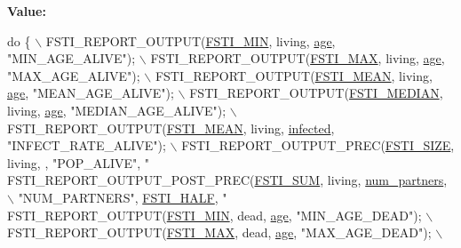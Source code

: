 {\bfseries Value\+:}
\begin{DoxyCode}
\textcolor{keywordflow}{do} \{                                           \(\backslash\)
        FSTI\_REPORT\_OUTPUT(\mbox{\hyperlink{fsti-report_8h_a23a8b3ad8faaf4c4f0f645486e27faeb}{FSTI\_MIN}}, living, \mbox{\hyperlink{structfsti__agent_a44c237039bb02720a770b625f905cf76}{age}}, \textcolor{stringliteral}{"MIN\_AGE\_ALIVE"});     \(\backslash\)
        FSTI\_REPORT\_OUTPUT(\mbox{\hyperlink{fsti-report_8h_ab932f3ee72d85924f642c9adfce84dc3}{FSTI\_MAX}}, living, \mbox{\hyperlink{structfsti__agent_a44c237039bb02720a770b625f905cf76}{age}}, \textcolor{stringliteral}{"MAX\_AGE\_ALIVE"});     \(\backslash\)
        FSTI\_REPORT\_OUTPUT(\mbox{\hyperlink{fsti-report_8h_a56c545164f457022ec874321798f99af}{FSTI\_MEAN}}, living, \mbox{\hyperlink{structfsti__agent_a44c237039bb02720a770b625f905cf76}{age}}, \textcolor{stringliteral}{"MEAN\_AGE\_ALIVE"});   \(\backslash\)
        FSTI\_REPORT\_OUTPUT(\mbox{\hyperlink{fsti-report_8h_abecbb06bd9bca39305faadb443899fa9}{FSTI\_MEDIAN}}, living, \mbox{\hyperlink{structfsti__agent_a44c237039bb02720a770b625f905cf76}{age}}, \textcolor{stringliteral}{"MEDIAN\_AGE\_ALIVE"}); \(\backslash\)
        FSTI\_REPORT\_OUTPUT(\mbox{\hyperlink{fsti-report_8h_a56c545164f457022ec874321798f99af}{FSTI\_MEAN}}, living, \mbox{\hyperlink{structfsti__agent_ae726e3b1cb42878ef3ca3148fe597a56}{infected}}, \textcolor{stringliteral}{"INFECT\_RATE\_ALIVE"}); \(\backslash\)
        FSTI\_REPORT\_OUTPUT\_PREC(\mbox{\hyperlink{fsti-report_8h_a43cc0a51906bd2c2ec0c77a15d50f145}{FSTI\_SIZE}}, living, , \textcolor{stringliteral}{"POP\_ALIVE"}, \textcolor{stringliteral}{"%
        FSTI\_REPORT\_OUTPUT\_POST\_PREC(\mbox{\hyperlink{fsti-report_8h_a5bb9a155a22683696d8123919e84c132}{FSTI\_SUM}}, living, \mbox{\hyperlink{structfsti__agent_aedbbb1bf31d18d91dd6b05f6d217755e}{num\_partners}},    \(\backslash\)
                                     \textcolor{stringliteral}{"NUM\_PARTNERS"}, \mbox{\hyperlink{fsti-report_8h_a37590f808a79f88b2369a0f77cb1b47e}{FSTI\_HALF}}, \textcolor{stringliteral}{"%
        FSTI\_REPORT\_OUTPUT(\mbox{\hyperlink{fsti-report_8h_a23a8b3ad8faaf4c4f0f645486e27faeb}{FSTI\_MIN}}, dead, \mbox{\hyperlink{structfsti__agent_a44c237039bb02720a770b625f905cf76}{age}}, \textcolor{stringliteral}{"MIN\_AGE\_DEAD"});        \(\backslash\)
        FSTI\_REPORT\_OUTPUT(\mbox{\hyperlink{fsti-report_8h_ab932f3ee72d85924f642c9adfce84dc3}{FSTI\_MAX}}, dead, \mbox{\hyperlink{structfsti__agent_a44c237039bb02720a770b625f905cf76}{age}}, \textcolor{stringliteral}{"MAX\_AGE\_DEAD"});        \(\backslash\)
}}
\end{DoxyCode}
